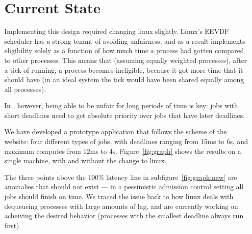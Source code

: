 \section{Current State}

Implementing this design required changing linux slightly. Linux's EEVDF
scheduler has a strong tenant of avoiding unfairness, and as a result implements
eligibility solely as a function of how much time a process had gotten compared
to other processes. This means that (assuming equally weighted processes), after
a tick of running, a process becomes ineligible, because it got more time that
it should have (in an ideal system the tick would have been shared equally among
all processes).

In \sysname, however, being able to be unfair for long periods of time is key:
jobs with short deadlines need to get absolute priority over jobs that have
later deadlines.

We have developed a prototype application that follows the scheme of the
website: four different types of jobs, with deadlines ranging from 15ms to 6s,
and maximum computes from 12ms to 4s. Figure~\ref{fig:graph} shows the results
on a single machine, with and without the change to linux. 

The three points above the 100$\%$ latency line in subfigure~\ref{fig:graph:new}
are anomalies that should not exist --- in a pessimistic admission control setting
all jobs should finish on time. We traced the issue back to how linux deals with
dequeueing processes with large amounts of lag, and are currently working on
acheiving the desired behavior (processes with the smallest deadline always run
first).